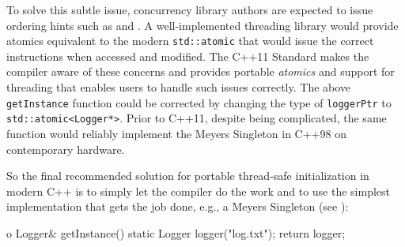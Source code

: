 To solve this subtle issue, concurrency library authors are expected to
issue ordering hints such as  and . A
well-implemented threading library would provide atomics equivalent to
the modern \lstinline!std::atomic! that would issue the correct
instructions when accessed and modified. The C++11 Standard makes the
compiler aware of these concerns and provides portable \emph{atomics}
and support for threading that enables users to handle such issues
correctly. The above \lstinline!getInstance! function could be corrected by
changing the type of \lstinline!loggerPtr! to
\lstinline!std::atomic<Logger*>!. Prior to C++11, despite being
complicated, the same function would reliably implement the Meyers
Singleton in C++98 on contemporary hardware.

\enlargethispage*{2ex} %
So the final recommended solution for portable thread-safe
initialization in modern C++ is to simply let the compiler do the work
and to use the simplest implementation that gets the job done, e.g., a
Meyers Singleton (see ):

\begin{emcppslisting}[emcppsbatch=e17]o
Logger& getInstance()
{
    static Logger logger("log.txt");
    return logger;
}
\end{emcppslisting}



